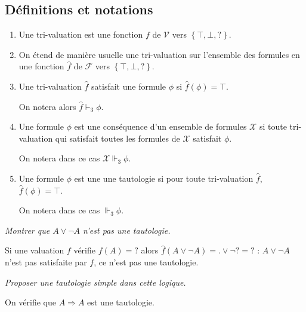 \subsection*{Définitions et notations}

\begin{enumerate}
    \item Une tri-valuation est une fonction $f$ de $\mathcal{V}$ vers $\left\{\top ,\bot ,?\right\}$.
    \item On étend de manière usuelle une tri-valuation sur l'ensemble des formules en une fonction $\widehat{f}$ de $\mathcal{F}$ vers $\left\{\top ,\bot ,?\right\}$.
    \item Une tri-valuation $\widehat{f}$ satisfait une formule $\phi $ si $\widehat{f}\left( \phi \right) =\top $. 
    
    On notera alors $\widehat{f}\vdash_{3} \phi $.

    \item Une formule $\phi $ est une conséquence d'un ensemble de formules $\mathcal{X}$ si toute tri-valuation qui satisfait toutes les formules de $\mathcal{X}$ satisfait $\phi $. 

On notera dans ce cas $\mathcal{X} \Vdash_{3}\phi$.
\item Une formule $\phi $ est une une tautologie si pour toute tri-valuation $\widehat{f}$, $\widehat{f}(\phi) =\top$. 

On notera dans ce cas $\Vdash_3 \phi$.
\end{enumerate}

\newpage

\begin{Exercise}\it
Montrer que $A\vee  \neg A$ n'est pas une tautologie.
\end{Exercise}
\begin{Answer}
Si une valuation $f$ vérifie $f(A)=?$ alors $\widehat f(A\vee \neg A) = .\vee \neg ?= ?$ : $A\vee \neg A$ n'est pas satisfaite par $f$, ce n'est pas une tautologie.
\end{Answer}
\begin{Exercise}\it
Proposer une tautologie simple dans cette logique.
\end{Exercise}
\begin{Answer}
On vérifie que $A \Rightarrow A$ est une tautologie.
\end{Answer}

